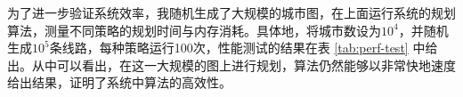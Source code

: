 为了进一步验证系统效率，我随机生成了大规模的城市图，在上面运行系统的规划算法，测量不同策略的规划时间与内存消耗。具体地，将城市数设为$10^4$，并随机生成$10^5$条线路，每种策略运行100次，性能测试的结果在表 \ref{tab:perf-test} 中给出。从中可以看出，在这一大规模的图上进行规划，算法仍然能够以非常快地速度给出结果，证明了系统中算法的高效性。



























